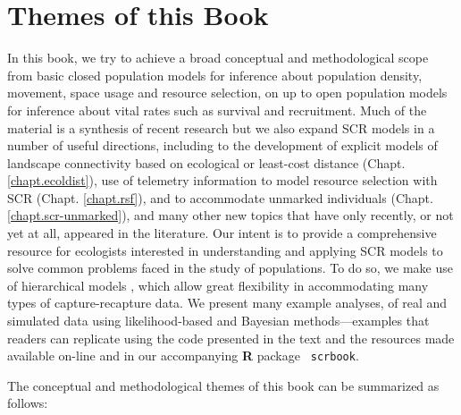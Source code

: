 \section*{Themes of this Book}

In this book, we try to achieve a broad
conceptual and
methodological scope from
basic closed population models for inference about population density,
movement, space usage and resource selection, on up to open population
models for inference about vital rates such as survival and
recruitment.  Much of the material is a synthesis of recent research
but we also expand SCR models in a number of useful directions,
including to
the development of explicit models of landscape
connectivity based on ecological or least-cost distance
(Chapt. \ref{chapt.ecoldist}),
use of telemetry information to model resource selection with SCR
(Chapt. \ref{chapt.rsf}), and to
 accommodate unmarked individuals
(Chapt. \ref{chapt.scr-unmarked}),
and many other new topics that have
only recently, or not yet at all, appeared in the literature.  Our intent
is to provide a comprehensive resource for ecologists interested in
understanding and applying SCR models to solve common problems faced
in the study of populations.  To do so, we make use of hierarchical
models \citep{royle_dorazio:2008}, which allow great
flexibility in accommodating many types of capture-recapture data. We
present many example analyses, of real and simulated data using
likelihood-based and Bayesian methods---examples that readers can
replicate using the code presented in the text and the resources made
available on-line and in our accompanying {\bf R} package {\tt
  scrbook}.



The conceptual and methodological themes of this book can be
summarized as follows:

